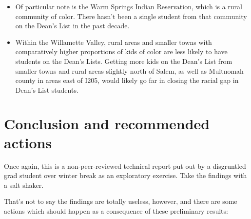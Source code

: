 \documentclass[10pt]{article}
\begin{document}
\begin{itemize}
	
	\item Of particular note is the Warm Springs Indian Reservation, which is a rural community of color. There hasn't been a single student from that community on the Dean's List in the past decade.
	
	\item Within the Willamette Valley, rural areas and smaller towns with comparatively higher proportions of kids of color are less likely to have students on the Dean's Lists. Getting more kids on the Dean's List from smaller towns and rural areas slightly north of Salem, as well as Multnomah county in areas east of I205, would likely go far in closing the racial gap in Dean's List students.
\end{itemize}


\section{Conclusion and recommended actions}

Once again, this is a non-peer-reviewed technical report put out by a disgruntled grad student over winter break as an exploratory exercise. Take the findings with a salt shaker.

That's not to say the findings are totally useless, however, and there are some actions which should happen as a consequence of these preliminary results:
\end{document}
